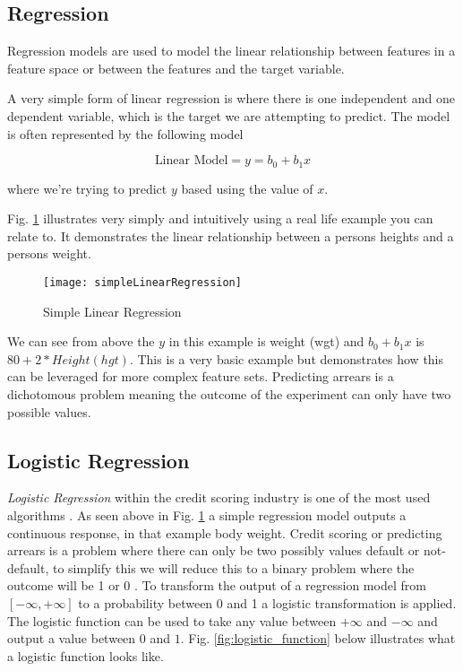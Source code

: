 \subsection{Regression} \label{Reg}
Regression models are used to model the linear relationship between features in a feature space or between the features and the target variable. 

A very simple form of linear regression is where there is one independent and one dependent variable, which is the target we are attempting to predict. The model is often represented by the following model

\begin{equation} \label{eq:reg}
	\text{Linear Model} = y = b_0 + b_1x
\end{equation}

where we're trying to predict $y$ based using the value of $x$.

Fig. \ref{fig:simpleLinearRegression} illustrates very simply and intuitively using a real life example you can relate to. It demonstrates the linear relationship between a persons heights and a persons weight.

\begin{figure}[H]
	\texttt{[image: simpleLinearRegression]}
	\caption[Confusion Matrix]
	{Simple Linear Regression}
	\label{fig:simpleLinearRegression}
\end{figure}

We can see from above the $y$ in this example is weight (wgt) and $b_0 + b_1x$ is $80 + 2*Height(hgt)$. This is a very basic example but demonstrates how this can be leveraged for more complex feature sets. Predicting arrears is a dichotomous problem meaning the outcome of the experiment can only have two possible values. 

\subsection{Logistic Regression} \label{LogReg}
\textit{Logistic Regression} \cite[See:][]{hosmer_applied_2000} within the credit scoring industry is one of the most used algorithms \citep{hand_evaluating_2010}. As seen above in Fig. \ref{fig:simpleLinearRegression} a simple regression model outputs a continuous response, in that example body weight. Credit scoring or predicting arrears is a problem where there can only be two possibly values default or not-default, to simplify this we will reduce this to a binary problem where the outcome will be 1 or 0 \citep{zou_modified_2004}. To transform the output of a regression model from $[-\infty, +\infty]$ to a probability between 0 and 1 a logistic transformation is applied. The logistic function can be used to take any value between $+\infty$ and $-\infty$ and output a value between $0$ and $1$. Fig. \ref{fig:logistic_function} below illustrates what a logistic function looks like.


